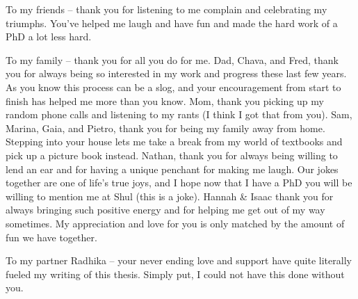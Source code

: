 

To my friends -- thank you for listening to me complain and celebrating my triumphs.
You've helped me laugh and have fun and made the hard work of a PhD a lot less hard.

To my family -- thank you for all you do for me. Dad, Chava, and Fred, thank you for always being so interested in my work and progress these last few years.
As you know this process can be a slog, and your encouragement from start to finish has helped me more than you know.
Mom, thank you picking up my random phone calls and listening to my rants (I think I got that from you).
Sam, Marina, Gaia, and Pietro, thank you for being my family away from home.
Stepping into your house lets me take a break from my world of textbooks and pick up a picture book instead. 
Nathan, thank you for always being willing to lend an ear and for having a unique penchant for making me laugh.
Our jokes together are one of life's true joys, and I hope now that I have a PhD you will be willing to mention me at Shul (this is a joke).
Hannah \& Isaac thank you for always bringing such positive energy and for helping me get out of my way sometimes.
My appreciation and love for you is only matched by the amount of fun we have together.

To my partner Radhika -- your never ending love and support have quite literally fueled my writing of this thesis.
Simply put, I could not have this done without you.
